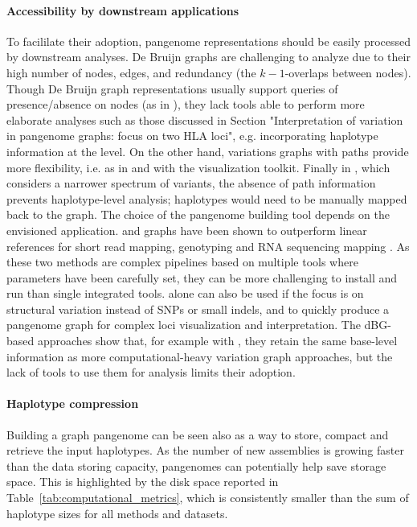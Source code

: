\paragraph{\textbf{\textup{Accessibility by downstream applications}}}
\label{subs:downstream}
To facililate their adoption, pangenome representations should be easily processed by downstream analyses. 
De Bruijn graphs are challenging to analyze due to their high number of nodes, edges, and redundancy (the $k-1$-overlaps between nodes).
Though De Bruijn graph representations usually support queries of presence/absence on nodes (as in \bifrost), they lack tools able to perform more elaborate analyses such as those discussed in Section "Interpretation of variation in pangenome graphs: focus on two HLA loci", e.g. incorporating haplotype information at the \kmer level. 
On the other hand, variations graphs with paths provide more flexibility, i.e. as in \pggb and \mcactus with the \odgi visualization toolkit.
Finally in \minigraph, which considers a narrower spectrum of variants, the absence of path information prevents haplotype-level analysis; haplotypes would need to be manually mapped back to the graph. 
The choice of the pangenome building tool depends on the envisioned application. \mbox{\pggb} and \mbox{\mcactus} graphs have been shown to outperform linear references for short read mapping, genotyping and RNA sequencing mapping \mbox{\cite{hdpr}}. As these two methods  are complex pipelines based on multiple tools where parameters have been carefully set, they can be more challenging to install and run than single integrated tools. \mbox{\minigraph} alone can also be used if the focus is on structural variation instead of SNPs or small indels, and to quickly produce a pangenome graph for complex loci visualization and interpretation. The dBG-based approaches show that, for example with \mbox{\bifrost}, they retain the same base-level information as more computational-heavy variation graph approaches, but the lack of tools to use them for analysis limits their adoption.

\paragraph{\textbf{\textup{Haplotype compression}}}
Building a graph pangenome can be seen also as a way to store, compact and retrieve the input haplotypes. As the number of new assemblies is growing faster than the data storing capacity, pangenomes can potentially help save storage space. This is highlighted by the disk space reported in Table~\ref{tab:computational_metrics}, which is consistently smaller than the sum of haplotype sizes for all methods and datasets.

